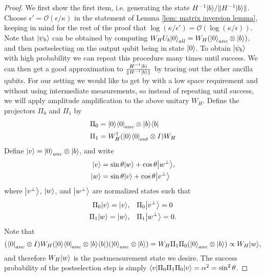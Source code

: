 \documentclass[11pt]{article}
\theoremstyle{definition}
\theoremstyle{remark}
\begin{document}
\begin{proof}
We first show the first item, i.e. generating the state $H^{-1}{\left\vert{b}\right\rangle} / \|H^{-1}{\left\vert{b}\right\rangle}\|$. Choose $\epsilon' = \mathcal{O}(\epsilon/\kappa)$ in the statement of Lemma \ref{lem: matrix inversion lemma}, keeping in mind for the rest of the proof that $\log(\kappa/\epsilon') = \mathcal{O}(\log(\kappa/\epsilon))$. Note that ${\left\vert{\psi_b}\right\rangle}$ can be obtained by computing $W_HU_b{\left\vert{0}\right\rangle}_{all} = W_H ({\left\vert{0}\right\rangle}_{anc} \otimes {\left\vert{b}\right\rangle})$, and then postselecting on the output qubit being in state ${\left\vert{0}\right\rangle}$. To obtain ${\left\vert{\psi_b}\right\rangle}$ with high probability we can repeat this procedure many times until success. We can then get a good approximation to $\frac{H^{-1}{\left\vert{b}\right\rangle}} {\|H^{-1}{\left\vert{b}\right\rangle}\|} $ by tracing out the other ancilla qubits. For our setting we would like to get by with a low space requirement and without using intermediate measurements, so instead of repeating until success, we will apply amplitude amplification to the above unitary $W_H$. Define the projectors $\Pi_0$ and $\Pi_1$ by
\begin{align}
\Pi_0 &= {\left\vert{0}\right\rangle}{\left\langle{0}\right\vert}_{anc} \otimes {\left\vert{b}\right\rangle}{\left\langle{b}\right\vert} \\
\Pi_1 &= W_H^\dagger ({\left\vert{0}\right\rangle}{\left\langle{0}\right\vert}_{out} \otimes I) W_H
\end{align}
Define ${\left\vert{v}\right\rangle} = {\left\vert{0}\right\rangle}_{anc}\otimes {\left\vert{b}\right\rangle}$, and write
\begin{align}
{\left\vert{v}\right\rangle} &= \sin \theta {\left\vert{w}\right\rangle} +\cos \theta{\left\vert{w^\perp}\right\rangle}, \\ 
{\left\vert{w}\right\rangle} &= \sin \theta {\left\vert{v}\right\rangle} + \cos \theta{\left\vert{v^\perp}\right\rangle}
\end{align}
where ${\left\vert{v^\perp}\right\rangle}$, ${\left\vert{w}\right\rangle}$, and ${\left\vert{w^\perp}\right\rangle}$ are normalized states such that 
\begin{align}
\Pi_0{\left\vert{v}\right\rangle} = {\left\vert{v}\right\rangle},&\quad \Pi_0{\left\vert{v^\perp}\right\rangle} = 0 \\
\Pi_1{\left\vert{w}\right\rangle} = {\left\vert{w}\right\rangle},&\quad \Pi_1{\left\vert{w^\perp}\right\rangle} = 0.
\end{align}
Note that
\begin{equation} 
({\left\langle{0}\right\vert}_{anc} \otimes I) W_H ({\left\vert{0}\right\rangle}{\left\langle{0}\right\vert}_{anc} \otimes {\left\vert{b}\right\rangle}{\left\langle{b}\right\vert}) ({\left\vert{0}\right\rangle}_{anc} \otimes {\left\vert{b}\right\rangle}) = W_H \Pi_1\Pi_0({\left\vert{0}\right\rangle}_{anc} \otimes {\left\vert{b}\right\rangle}) \propto W_H {\left\vert{w}\right\rangle},
\end{equation}
and therefore $W_H{\left\vert{w}\right\rangle}$ is the postmeasurement state we desire. The success probability of the postselection step is simply ${\left\langle{v}\right\vert}\Pi_0\Pi_1\Pi_0{\left\vert{v}\right\rangle} = \alpha^2 = \sin^2\theta$. 


\end{proof}
\end{document}
